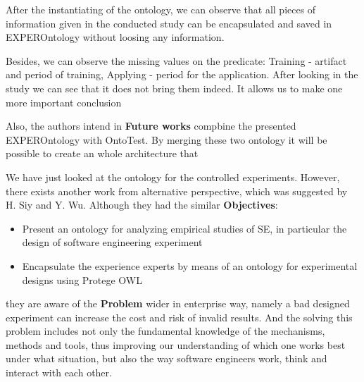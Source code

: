 	 After the instantiating of the ontology, we can observe that all pieces of information given in the conducted study can be encapsulated and saved in EXPEROntology without loosing any information. \newline
	 
	 Besides, we can observe the missing values on the predicate: Training - artifact and period of training, Applying - period for the application. After looking in the study we can see that it does not bring them indeed. It allows us to make one more important conclusion \frqq\cite[p. 6]{Gar08} \newline
	 
	 Also, the authors intend in \textbf{Future works} compbine the presented EXPEROntology with OntoTest. By merging these two ontology it will be possible to create an whole architecture that \frqq\cite[p.6]{Gar08}
	 \newline
	 
	 We have just looked at the ontology for the controlled experiments. However, there exists another work from alternative perspective, which was suggested by H. Siy and Y. Wu\cite{SiyWu12}. Although they had the similar \textbf{Objectives}:
	  \begin{itemize}
	 	\item Present an ontology for analyzing empirical studies of SE, in particular the design of software engineering experiment
	 	\item Encapsulate the experience experts by means of an ontology for experimental designs using Protege OWL
	 \end{itemize}
	they are aware of the \textbf{Problem} wider in enterprise way, namely a bad designed experiment can increase the cost and risk of invalid results. And the solving this problem includes not only the fundamental knowledge of the mechanisms, methods and tools,
	thus improving our understanding of which one works best under what situation, but also the way software engineers work, think and interact with each other.
	
